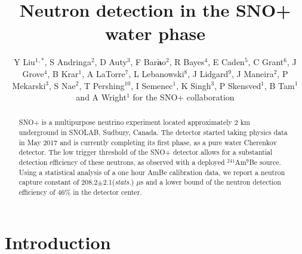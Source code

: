 \documentclass[a4paper]{jpconf}
\begin{document}
\title{Neutron detection in the SNO+ water phase}

\author{Y Liu$^1$$^{,\ast}$, S Andringa$^2$, D Auty$^3$, F Bar$\tilde{\textbf{a}}$o$^2$, R Bayes$^4$, E Caden$^5$, C Grant$^6$, J Grove$^4$, B Krar$^1$, A LaTorre$^7$, L Lebanowski$^8$, J Lidgard$^9$, J Maneira$^2$, P Mekarski$^3$, S Nae$^2$, T Pershing$^{10}$, I Semenec$^1$, K Singh$^3$, P Skensved$^1$, B Tam$^1$ and A Wright$^1$ for the SNO+ collaboration}

\address{$^1$ Queen's University, Department of Physics, Engineering Physics \& Astronomy, Kingston ON K7L 3N6, Canada}
\address{$^2$ Laborat\'{o}rio de Instrumenta{\c c}$\tilde{a}$o e F{\'{i}}sica Experimental de Part{\'{i}}culas, Av. Prof. Gama Pinto, 2, 1649-003, Lisbon, Portugal}
\address{$^3$ University of Alberta, Department of Physics, 4-181 CCIS, Edmonton, AB T6G 2E, Canada}
\address{$^4$ Laurentian University, 935 Ramsey Lake Road, Sudbury, ON P3E 2C6, Canada}
\address{$^5$ SNOLAB, Creighton Mine \#9, 1039 Regional Road 24, Sudbury, ON P3Y 1N2, Canada}
\address{$^6$ Boston University, Department of Physics, Boston, MA 02215, USA}
\address{$^7$ University of Chicago, Department of Physics, Chicago, IL 60637, USA}
\address{$^8$ University of Pennsylvania, Department of Physics \& Astronomy, Philadelphia, PA 19104-6396, USA}
\address{$^9$ University of Oxford, The Denys Wilkinson Building, Keble Road, Oxford, OX1 3RH, UK}
\address{$^{10}$ University of California, 1 Shields Avenue, Davis, CA 95616, USA}


\begin{abstract}
SNO+ is a multipurpose neutrino experiment located approximately 2 km underground in SNOLAB, Sudbury, Canada. The detector started taking physics data in May 2017 and is currently completing its first phase, as a pure water Cherenkov detector. The low trigger threshold of the SNO+ detector allows for a substantial detection efficiency of these neutrons, as observed with a deployed $^{241}$Am$^{9}$Be source. Using a statistical analysis of a one hour AmBe calibration data, we report a neutron capture constant of 208.2$\pm$2.1(\textit{stats.}) $\mu$s and a lower bound of the neutron detection efficiency of 46\% in the detector center.
\end{abstract}

\section{Introduction}
\end{document}
